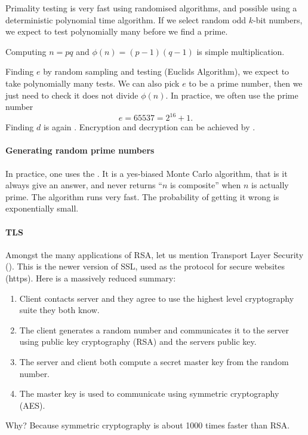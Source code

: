 \documentclass[a4paper, 11pt, openany]{book}
\begin{document}
Primality testing is very fast using randomised algorithms, and possible using a deterministic polynomial time algorithm. If we select random odd $k$-bit numbers, we expect to test polynomially many before we find a prime.

Computing $n = pq$ and $\phi(n) = (p-1)(q-1)$ is simple multiplication.

Finding $e$ by random sampling and testing (Euclids Algorithm), we expect to take polynomially many tests. We can also pick $e$ to be a prime number, then we just need to check it does not divide $\phi(n)$. In practice, we often use the prime number
\[
    e = 65537 = 2^{16}+1.
\]
Finding $d$ is again . Encryption and decryption can be achieved by .



\paragraph{Generating random prime numbers}
In practice, one uses the . It is a yes-biased Monte Carlo algorithm, that is it always give an answer, and never returns ``$n$ is composite'' when $n$ is actually prime. The algorithm runs very fast. The probability of getting it wrong is exponentially small.



\paragraph{TLS}
Amongst the many applications of RSA, let us mention Transport Layer Security (). This is the newer version of SSL, used as the protocol for secure websites (https). Here is a massively reduced summary:
\begin{enumerate}
	\item Client contacts server and they agree to use the highest level cryptography suite they both know.

	\item The client generates a random number and communicates it to the server using public key cryptography (RSA) and the servers public key.

	\item The server and client both compute a secret master key from the random number.

	\item The master key is used to communicate using symmetric cryptography (AES).
\end{enumerate}
Why? Because symmetric cryptography is about 1000 times faster than RSA.
\end{document}
